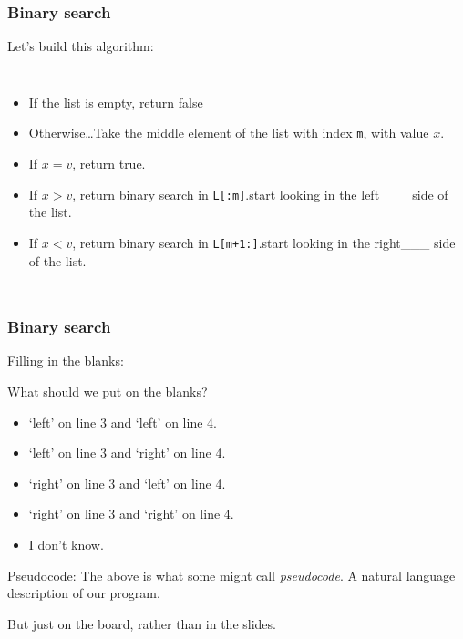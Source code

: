 \begin{frame}
	\frametitle{Binary search}
	
		Let's build this algorithm:
		
			\begin{columns}[t]
					
		\begin{itemize}
\item If the list is empty, return false
		\item Otherwise\dots Take the middle element of the list with index \texttt{m}, with value $x$.
		\item If $x = v$, return true.
		
		\item If $x > v$, return binary search in \texttt{L[:m]}.{start looking in the left{\_\_\_} side of the list.}
		\item If $x < v$, return binary search in \texttt{L[m+1:]}.{start looking in the right{\_\_\_} side of the list.}
		\end{itemize}

				

			\end{columns}


\end{frame}

\begin{frame}
	\frametitle{Binary search}

Filling in the blanks:

				What should we put on the blanks?
				
				\begin{itemize}
					\item `left' on line 3 and `left' on line 4. 
					\item `left' on line 3 and `right' on line 4. 
					\item `right' on line 3 and `left' on line 4. 
					\item `right' on line 3 and `right' on line 4. 
					\item I don't know.
				\end{itemize}	

Pseudocode:
				The above is what some might call \textit{pseudocode}. A natural language description of our program.			

				But just on the board, rather than in the slides.

\end{frame}

